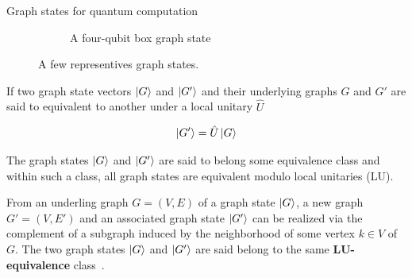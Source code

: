\documentclass[final]{beamer}
\newlength{\colwidth}
\begin{document}
\begin{frame}[t]
\begin{columns}[t]
\begin{column}{\colwidth}
\begin{block}{Graph states for quantum computation}
\begin{figure}[H]
\begin{subfigure}[b]{0.40\textwidth}
                            \label{fig:linear_cluster_4q}
                        \end{subfigure}
                        \begin{subfigure}[b]{0.40\textwidth}
                            \centering
                            \caption{A four-qubit box graph state}
                            \label{fig:box_cluster_4q}
                        \end{subfigure}
                        \caption{A few representives graph states. }
                        \label{fig:graph_states}
                    \end{figure}

                    If two graph state vectors $\ket{G}$ and $\ket{G'}$  and their
                    underlying graphs $G$ and  $G'$ are said to
                    equivalent to another under a local unitary $\hat{U}$ 

                    \begin{align}
                        \ket{G'} = \hat{U}\ket{G}
                        \label{eq:graph_state_unitary_equivalence}
                    \end{align}

                    The graph states $\ket{G}$ and  $\ket{G'}$ are said to belong some
                    equivalence class and within such a class, all graph states are
                    equivalent modulo local unitaries (LU). 


                    From an underling graph $G = (V, E)$ of a graph state $\ket{G}$, a new
                    graph $G' = (V, E')$ and an associated graph state $\ket{G'}$ can be
                    realized via the complement of a subgraph induced by the neighborhood of some vertex $k
                    \in V$ of $G$. The two graph states $\ket{G}$ and $\ket{G'}$ are said belong to the same
                    \textbf{LU-equivalence} class~\cite{PhysRevA.69.062311}.
                \end{block}
            \end{column}


\end{columns}
\end{frame}
\end{document}
